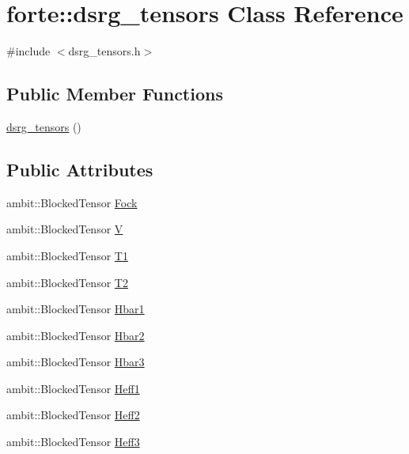 \hypertarget{classforte_1_1dsrg__tensors}{}\section{forte\+:\+:dsrg\+\_\+tensors Class Reference}
\label{classforte_1_1dsrg__tensors}


{\ttfamily \#include $<$dsrg\+\_\+tensors.\+h$>$}

\subsection*{Public Member Functions}
\begin{DoxyCompactItemize}
\item 
\mbox{\hyperlink{classforte_1_1dsrg__tensors_ab002395de027ca4facbdfcd28761147a}{dsrg\+\_\+tensors}} ()
\end{DoxyCompactItemize}
\subsection*{Public Attributes}
\begin{DoxyCompactItemize}
\item 
ambit\+::\+Blocked\+Tensor \mbox{\hyperlink{classforte_1_1dsrg__tensors_a9cf8ed544e2a8bbf76b607d0b7ec79d9}{Fock}}
\item 
ambit\+::\+Blocked\+Tensor \mbox{\hyperlink{classforte_1_1dsrg__tensors_ad6a2c5c5871706e5030e175407e466c2}{V}}
\item 
ambit\+::\+Blocked\+Tensor \mbox{\hyperlink{classforte_1_1dsrg__tensors_aeaff2a9b697cb8df97d1e311bfab7636}{T1}}
\item 
ambit\+::\+Blocked\+Tensor \mbox{\hyperlink{classforte_1_1dsrg__tensors_a2808863402de85439422c1113af70a75}{T2}}
\item 
ambit\+::\+Blocked\+Tensor \mbox{\hyperlink{classforte_1_1dsrg__tensors_a92945252de459c446e72820fed92afbc}{Hbar1}}
\item 
ambit\+::\+Blocked\+Tensor \mbox{\hyperlink{classforte_1_1dsrg__tensors_a064f51aee423bb14b20fb76dad4c8272}{Hbar2}}
\item 
ambit\+::\+Blocked\+Tensor \mbox{\hyperlink{classforte_1_1dsrg__tensors_a3192ba68af73479375e17aca7affb83d}{Hbar3}}
\item 
ambit\+::\+Blocked\+Tensor \mbox{\hyperlink{classforte_1_1dsrg__tensors_ad5037f7d14388f6081a939b204d4d1a9}{Heff1}}
\item 
ambit\+::\+Blocked\+Tensor \mbox{\hyperlink{classforte_1_1dsrg__tensors_afa7854b1a7bb4e11316325f65d6b97c2}{Heff2}}
\item 
ambit\+::\+Blocked\+Tensor \mbox{\hyperlink{classforte_1_1dsrg__tensors_a0e7c9961567338e96f830f3623d5aada}{Heff3}}
\end{DoxyCompactItemize}


